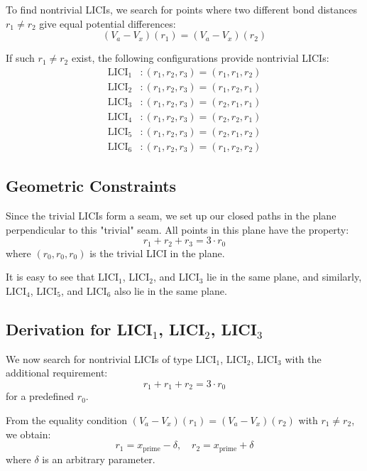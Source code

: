 \documentclass{article}
\begin{document}
To find nontrivial LICIs, we search for points where two different bond distances $r_1 \neq r_2$ give equal potential differences:
\begin{equation}
(V_a - V_x)(r_1) = (V_a - V_x)(r_2)
\end{equation}

If such $r_1 \neq r_2$ exist, the following configurations provide nontrivial LICIs:
\begin{align}
\text{LICI}_1 &: (r_1, r_2, r_3) = (r_1, r_1, r_2) \\
\text{LICI}_2 &: (r_1, r_2, r_3) = (r_1, r_2, r_1) \\
\text{LICI}_3 &: (r_1, r_2, r_3) = (r_2, r_1, r_1) \\
\text{LICI}_4 &: (r_1, r_2, r_3) = (r_2, r_2, r_1) \\
\text{LICI}_5 &: (r_1, r_2, r_3) = (r_2, r_1, r_2) \\
\text{LICI}_6 &: (r_1, r_2, r_3) = (r_1, r_2, r_2)
\end{align}

\subsection{Geometric Constraints}

Since the trivial LICIs form a seam, we set up our closed paths in the plane perpendicular to this "trivial" seam. All points in this plane have the property:
\begin{equation}
r_1 + r_2 + r_3 = 3 \cdot r_0
\end{equation}
where $(r_0, r_0, r_0)$ is the trivial LICI in the plane.

It is easy to see that $\text{LICI}_1$, $\text{LICI}_2$, and $\text{LICI}_3$ lie in the same plane, and similarly, $\text{LICI}_4$, $\text{LICI}_5$, and $\text{LICI}_6$ also lie in the same plane.

\subsection{Derivation for LICI$_1$, LICI$_2$, LICI$_3$}

We now search for nontrivial LICIs of type $\text{LICI}_1$, $\text{LICI}_2$, $\text{LICI}_3$ with the additional requirement:
\begin{equation}
r_1 + r_1 + r_2 = 3 \cdot r_0
\end{equation}
for a predefined $r_0$.

From the equality condition $(V_a - V_x)(r_1) = (V_a - V_x)(r_2)$ with $r_1 \neq r_2$, we obtain:
\begin{equation}
r_1 = x_{\text{prime}} - \delta, \quad r_2 = x_{\text{prime}} + \delta
\end{equation}
where $\delta$ is an arbitrary parameter.
\end{document}
